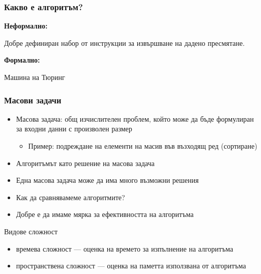 \documentclass{beamer}
\begin{document}
\begin{frame}
  \frametitle{Какво е алгоритъм?}

  \pause

  \textbf{Неформално:}

  Добре дефиниран набор от инструкции за извършване на дадено пресмятане.
  \vspace{2cm}

  \pause

  \textbf{Формално:}

  Машина на Тюринг
\end{frame}

\begin{frame}
  \frametitle{Масови задачи}

  \begin{itemize}[<+->]
  \item Масова задача: общ изчислителен проблем, който може да бъде формулиран за входни данни с произволен размер
    \begin{itemize}
    \item Пример: подреждане на елементи на масив във възходящ ред (сортиране)
    \end{itemize}
  \item Алгоритъмът като решение на масова задача
  \item Една масова задача може да има много възможни решения
  \item \alert{Как да сравнявамеме алгоритмите?}
  \item Добре е да имаме мярка за ефективността на алгоритъма
  \end{itemize}

  \pause
  \vspace{1em}
  Видове сложност
  \begin{itemize}
  \item времева сложност --- оценка на времето за изпълнение на алгоритъма
  \item пространствена сложност --- оценка на паметта използвана от алгоритъма
  \end{itemize}

\end{frame}
\end{document}

